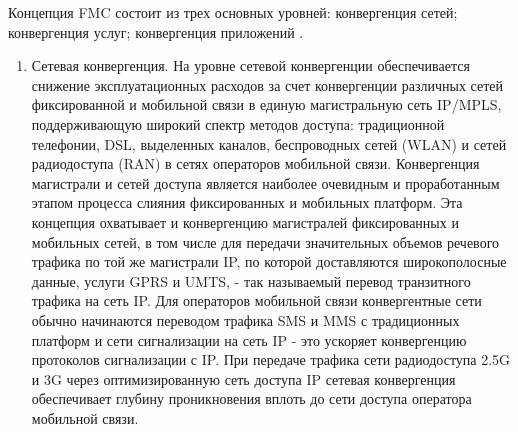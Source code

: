 Концепция FMC состоит из трех основных уровней: конвергенция сетей; конвергенция услуг; конвергенция приложений \cite{IMS}.
\begin{enumerate}
\item Сетевая конвергенция. На уровне сетевой конвергенции обеспечивается снижение эксплуатационных расходов за счет конвергенции различных сетей фиксированной и мобильной связи в единую магистральную сеть IP/MPLS, поддерживающую широкий спектр методов доступа: традиционной телефонии, DSL, выделенных каналов, беспроводных сетей (WLAN) и сетей радиодоступа (RAN) в сетях операторов мобильной связи. Конвергенция магистрали и сетей доступа является наиболее очевидным и проработанным этапом процесса слияния фиксированных и мобильных платформ. Эта концепция охватывает и конвергенцию магистралей фиксированных и мобильных сетей, в том числе для передачи значительных объемов речевого трафика по той же магистрали IP, по которой доставляются широкополосные данные, услуги GPRS и UMTS, - так называемый перевод транзитного трафика на сеть IP. Для операторов мобильной связи конвергентные сети обычно начинаются переводом трафика SMS и MMS с традиционных платформ и сети сигнализации на сеть IP - это ускоряет конвергенцию протоколов сигнализации с IP. При передаче трафика сети радиодоступа 2.5G и 3G через оптимизированную сеть доступа IP сетевая конвергенция обеспечивает глубину проникновения вплоть до сети доступа оператора мобильной связи.



\end{enumerate}
